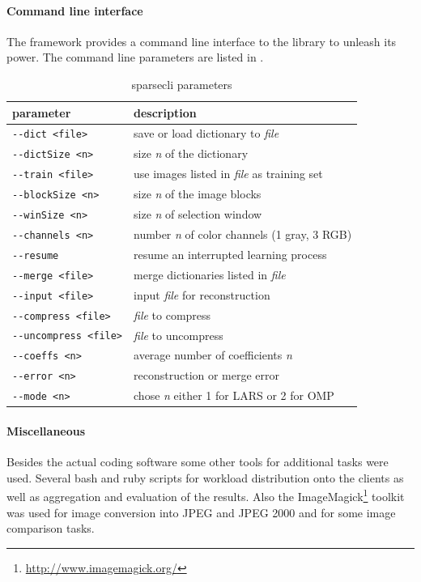 \paragraph{Command line interface}
The framework provides a command line interface to the library to unleash its
power. The command line parameters are listed in .
%
\begin{table}[h]
\centering
\begin{tabular}{ |l | l |}
\hline
parameter & description \\
\hline
\verb+--dict <file>+ & save or load dictionary to \emph{file}\\
\verb+--dictSize <n>+ & size \emph{n} of the dictionary  \\
\verb+--train <file>+ & use images listed in \emph{file} as training set\\
\verb+--blockSize <n>+ & size \emph{n} of the image blocks \\
\verb+--winSize <n>+ & size \emph{n} of selection window \\
\verb+--channels <n>+ &number \emph{n} of color channels (1 gray, 3 RGB) \\

\verb+--resume+ & resume an interrupted learning process \\
\verb+--merge <file>+ & merge dictionaries listed in \emph{file}  \\
\verb+--input <file>+ & input \emph{file} for reconstruction \\
\verb+--compress <file>+ & \emph{file} to compress \\
\verb+--uncompress <file>+ & \emph{file} to uncompress \\
\verb+--coeffs <n>+ & average number of coefficients \emph{n} \\
\verb+--error <n>+ & reconstruction or merge error \\
\verb+--mode <n>+ & chose \emph{n} either 1 for LARS or 2 for OMP \\
\hline
\end{tabular}
\caption{sparsecli parameters}\label{tab:cli}
\end{table}

\paragraph{Miscellaneous}
Besides the actual coding software some other tools for
additional tasks were used. Several bash and ruby scripts for workload
distribution onto the clients as well as aggregation and evaluation of the
results. 
Also the ImageMagick\footnote{\url{http://www.imagemagick.org/}} toolkit was
used for image conversion into JPEG and JPEG 2000 and for some image comparison
tasks.


